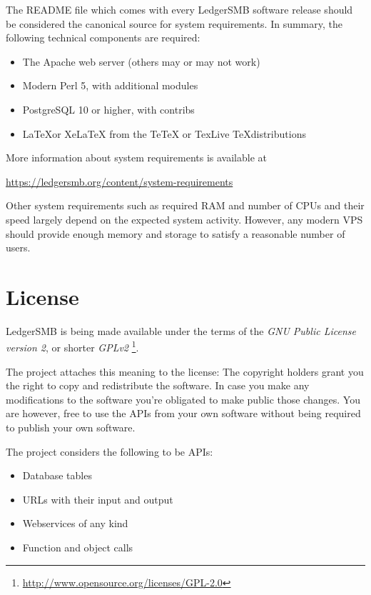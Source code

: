 The README file which comes with every LedgerSMB software release should be
considered the canonical source for system requirements. In summary, the
following technical components are required:

\begin{itemize}
\item The Apache web server (others may or may not work)
\item Modern Perl 5, with additional modules
\item PostgreSQL 10 or higher, with contribs
\item \LaTeX or XeLaTeX from the TeTeX or TexLive \TeX distributions
\end{itemize}

More information about system requirements is available at

\href{https://ledgersmb.org/content/system-requirements}{https://ledgersmb.org/content/system-requirements} 

Other system requirements such as required RAM and number of CPUs and their speed
largely depend on the expected system activity. However, any modern VPS should
provide enough memory and storage to satisfy a reasonable number of users.

\section{License}
\label{sec-ledgersmb-license}

LedgerSMB is being made available under the terms of the
\textit{GNU Public License version 2}, or shorter \textit{GPLv2}
\footnote{\url{http://www.opensource.org/licenses/GPL-2.0}}.

The project attaches this meaning to the license:
The copyright holders grant you the right to copy and
redistribute the software.  In case you make any modifications to the software
you're obligated to make public those changes.  You are however, free to use
the APIs from your own software without being required to publish your own software.

The project considers the following to be APIs:
\begin{itemize}
\item Database tables
\item URLs with their input and output
\item Webservices of any kind
\item Function and object calls
\end{itemize}

